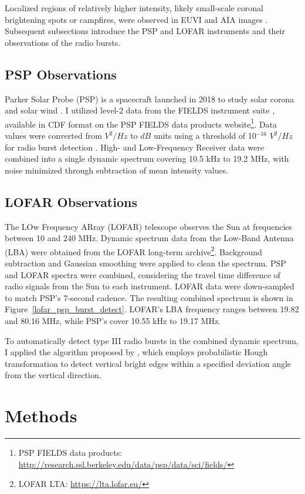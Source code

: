 Localized regions of relatively higher intensity, likely small-scale coronal brightening spots or campfires, were observed in EUVI and AIA images \cite{young_2018, madjarska_2019, berghmans_2021}. Subsequent subsections introduce the PSP and LOFAR instruments and their observations of the radio bursts.

\subsection{PSP Observations}
Parker Solar Probe (PSP) is a spacecraft launched in 2018 to study solar corona and solar wind \citep{fox_2016}. I utilized level-2 data from the FIELDS instrument suite \citep{bale_2016, pulupa_2017}, available in CDF format on the PSP FIELDS data products website\footnote{PSP FIELDS data products: \url{http://research.ssl.berkeley.edu/data/psp/data/sci/fields/}}. Data values were converted from $V^2/Hz$ to $dB$ units using a threshold of 10$^{-16}$ $V^2/Hz$ for radio burst detection \citep{pulupa_2020}. High- and Low-Frequency Receiver data were combined into a single dynamic spectrum covering 10.5 kHz to 19.2 MHz, with noise minimized through subtraction of mean intensity values.

\subsection{LOFAR Observations}
The LOw Frequency ARray (LOFAR) telescope \citep{lofar_2013} observes the Sun at frequencies between 10 and 240 MHz. Dynamic spectrum data from the Low-Band Antenna (LBA) were obtained from the LOFAR long-term archive\footnote{LOFAR LTA: \url{https://lta.lofar.eu/}}. Background subtraction and Gaussian smoothing were applied to clean the spectrum. PSP and LOFAR spectra were combined, considering the travel time difference of radio signals from the Sun to each instrument. LOFAR data were down-sampled to match PSP's 7-second cadence. The resulting combined spectrum is shown in Figure~\ref{lofar_psp_burst_detect}. LOFAR's LBA frequency ranges between 19.82 and 80.16 MHz, while PSP's cover 10.55 kHz to 19.17 MHz.

To automatically detect type III radio bursts in the combined dynamic spectrum, I applied the algorithm proposed by \citet{zhang_2018}, which employs probabilistic Hough transformation to detect vertical bright edges within a specified deviation angle from the vertical direction.

\section{Methods}
\label{sec_ch3_methods}
